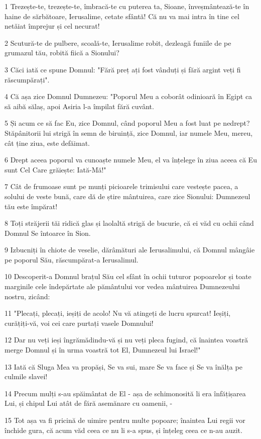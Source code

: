 \par 1 Trezește-te, trezește-te, îmbracă-te cu puterea ta, Sioane, înveșmântează-te în haine de sărbătoare, Ierusalime, cetate sfântă! Că nu va mai intra în tine cel netăiat împrejur și cel necurat!
\par 2 Scutură-te de pulbere, scoală-te, Ierusalime robit, dezleagă funiile de pe grumazul tău, robită fiică a Sionului?
\par 3 Căci iată ce spune Domnul: "Fără preț ați fost vânduți și fără argint veți fi răscumpărați".
\par 4 Că așa zice Domnul Dumnezeu: "Poporul Meu a coborât odinioară în Egipt ca să aibă sălaș, apoi Asiria l-a împilat fără cuvânt.
\par 5 Și acum ce să fac Eu, zice Domnul, când poporul Meu a fost luat pe nedrept? Stăpânitorii lui strigă în semn de biruință, zice Domnul, iar numele Meu, mereu, cât ține ziua, este defăimat.
\par 6 Drept aceea poporul va cunoaște numele Meu, el va înțelege în ziua aceea că Eu sunt Cel Care grăiește: Iată-Mă!"
\par 7 Cât de frumoase sunt pe munți picioarele trimisului care vestește pacea, a solului de veste bună, care dă de știre mântuirea, care zice Sionului: Dumnezeul tău este împărat!
\par 8 Toți străjerii tăi ridică glas și laolaltă strigă de bucurie, că ei văd cu ochii când Domnul Se întoarce în Sion.
\par 9 Izbucniți în chiote de veselie, dărâmături ale Ierusalimului, că Domnul mângâie pe poporul Său, răscumpărat-a Ierusalimul.
\par 10 Descoperit-a Domnul brațul Său cel sfânt în ochii tuturor popoarelor și toate marginile cele îndepărtate ale pământului vor vedea mântuirea Dumnezeului nostru, zicând:
\par 11 "Plecați, plecați, ieșiți de acolo! Nu vă atingeți de lucru spurcat! Ieșiți, curățiți-vă, voi cei care purtați vasele Domnului!
\par 12 Dar nu veți ieși îngrămădindu-vă și nu veți pleca fugind, că înaintea voastră merge Domnul și în urma voastră tot El, Dumnezeul lui Israel!"
\par 13 Iată că Sluga Mea va propăși, Se va sui, mare Se va face și Se va înălța pe culmile slavei!
\par 14 Precum mulți s-au spăimântat de El - așa de schimonosită li era înfățișarea Lui, și chipul Lui atât de fără asemănare cu oamenii, -
\par 15 Tot așa va fi pricină de uimire pentru multe popoare; înaintea Lui regii vor închide gura, că acum văd ceea ce nu li s-a spus, și înțeleg ceea ce n-au auzit.

